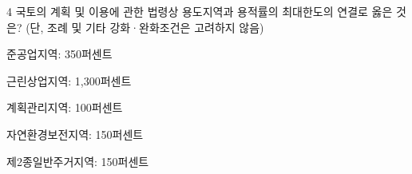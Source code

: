 \begin{question}{4}
국토의 계획 및 이용에 관한 법령상 용도지역과 용적률의 최대한도의 연결로 옳은 것은? (단, 조례 및 기타 강화·완화조건은 고려하지 않음)
\begin{choices}
  \item 준공업지역: 350퍼센트
  \item 근린상업지역: 1,300퍼센트
  \item 계획관리지역: 100퍼센트
  \item 자연환경보전지역: 150퍼센트
  \item 제2종일반주거지역: 150퍼센트
\end{choices}
\end{question}
